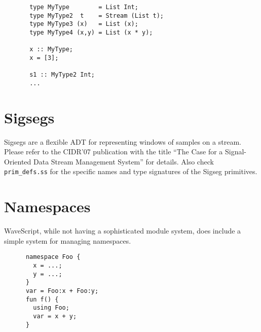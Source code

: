 \documentclass[twocolumn]{report}
\begin{document}
\begin{center}
\begin{verbatim}
       type MyType        = List Int;
       type MyType2  t    = Stream (List t);
       type MyType3 (x)   = List (x);
       type MyType4 (x,y) = List (x * y);

       x :: MyType;
       x = [3];

       s1 :: MyType2 Int;
       ...
\end{verbatim}
\end{center}


\section{Sigsegs}

Sigsegs are a flexible ADT for representing windows of samples on a stream.
Please refer to the CIDR'07 publication with the title
``The Case for a Signal-Oriented Data Stream Management System'' for
details.  Also check {\tt prim\_defs.ss} for the specific names and
type signatures of the Sigseg primitives.






  






\section{Namespaces}\label{s:namespaces}

WaveScript, while not having a sophisticated module system, does
include a simple system for managing namespaces.

\begin{center}
\begin{verbatim}
      namespace Foo {
        x = ...;
        y = ...;
      }
      var = Foo:x + Foo:y;
      fun f() {
        using Foo;
        var = x + y;
      }
\end{verbatim}
\end{center}
\end{document}
